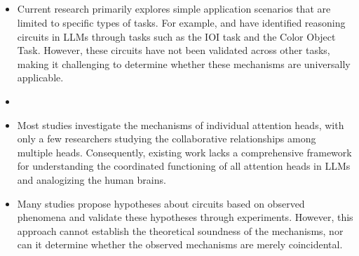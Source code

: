 \documentclass[12pt,letterpaper]{article}
\begin{document}
\subsection*{}
\begin{itemize}
    \item {} Current research primarily explores simple application scenarios that are limited to specific types of tasks. For example, \citet{IOI_23_ICLR_Redwood} and \citet{ColorObject_24_ICLR_BrownU} have identified reasoning circuits in LLMs through tasks such as the IOI task and the Color Object Task. However, these circuits have not been validated across other tasks, making it challenging to determine whether these mechanisms are universally applicable.

    \item {}
    
    \item {} Most studies investigate the mechanisms of individual attention heads, with only a few researchers studying the collaborative relationships among multiple heads. Consequently, existing work lacks a comprehensive framework for understanding the coordinated functioning of all attention heads in LLMs and analogizing the human brains.

    \item {} Many studies propose hypotheses about circuits based on observed phenomena and validate these hypotheses through experiments. However, this approach cannot establish the theoretical soundness of the mechanisms, nor can it determine whether the observed mechanisms are merely coincidental.
\end{itemize}
\end{document}
